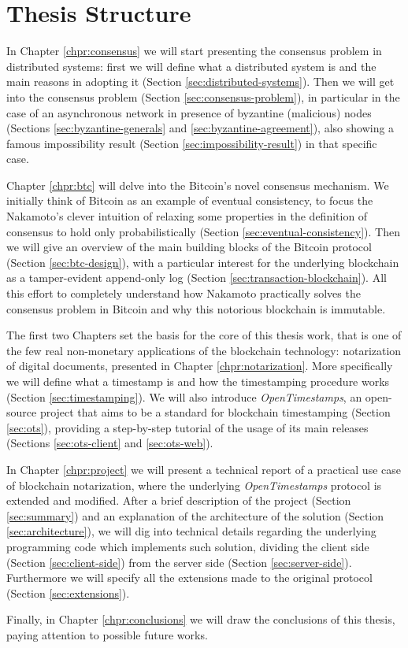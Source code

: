\bigskip
\section{Thesis Structure}
In Chapter \ref{chpr:consensus} we will start presenting the consensus problem in distributed systems: first we will define what a distributed system is and the main reasons in adopting it (Section \ref{sec:distributed-systems}). Then we will get into the consensus problem (Section \ref{sec:consensus-problem}), in particular in the case of an asynchronous network in presence of byzantine (malicious) nodes (Sections \ref{sec:byzantine-generals} and \ref{sec:byzantine-agreement}), also showing a famous impossibility result (Section \ref{sec:impossibility-result}) in that specific case.

\bigskip
\noindent
Chapter \ref{chpr:btc} will delve into the Bitcoin's novel consensus mechanism. We initially think of Bitcoin as an example of eventual consistency, to focus the Nakamoto's clever intuition of relaxing some properties in the definition of consensus to hold only probabilistically (Section \ref{sec:eventual-consistency}). Then we will give an overview of the main building blocks of the Bitcoin protocol (Section \ref{sec:btc-design}), with a particular interest for the underlying blockchain as a tamper-evident append-only log (Section \ref{sec:transaction-blockchain}). All this effort to completely understand how Nakamoto practically solves the consensus problem in Bitcoin and why this notorious blockchain is immutable.

\bigskip
\noindent
The first two Chapters set the basis for the core of this thesis work, that is one of the few real non-monetary applications of the blockchain technology: notarization of digital documents, presented in Chapter \ref{chpr:notarization}. More specifically we will define what a timestamp is and how the timestamping procedure works (Section \ref{sec:timestamping}). We will also introduce \textit{OpenTimestamps}, an open-source project that aims to be a standard for blockchain timestamping (Section \ref{sec:ots}), providing a step-by-step tutorial of the usage of its main releases (Sections \ref{sec:ots-client} and \ref{sec:ots-web}).

\bigskip
\noindent
In Chapter \ref{chpr:project} we will present a technical report of a practical use case of blockchain notarization, where the underlying \textit{OpenTimestamps} protocol is extended and modified. After a brief description of the project (Section \ref{sec:summary}) and an explanation of the architecture of the solution (Section \ref{sec:architecture}), we will dig into technical details regarding the underlying programming code which implements such solution, dividing the client side (Section \ref{sec:client-side}) from the server side (Section \ref{sec:server-side}). Furthermore we will specify all the extensions made to the original protocol (Section \ref{sec:extensions}).

\bigskip
\noindent
Finally, in Chapter \ref{chpr:conclusions} we will draw the conclusions of this thesis, paying attention to possible future works.